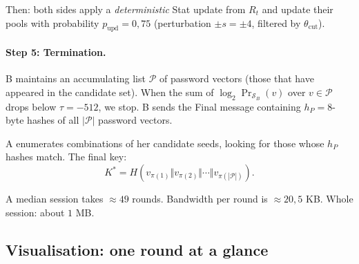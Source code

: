 \documentclass[11pt,a4paper]{article}
\begin{document}
Then: both sides apply a \emph{deterministic} Stat update from $R_t$ and update their pools with probability $p_\text{upd} = 0{,}75$ (perturbation $\pm s = \pm 4$, filtered by $\theta_\text{cut}$).

\paragraph{Step 5: Termination.}
B maintains an accumulating list $\mathcal{P}$ of password vectors (those that have appeared in the candidate set). When the sum of $\log_2 \Pr_{\mathcal{S}_B}(v)$ over $v \in \mathcal{P}$ drops below $\tau = -512$, we stop. B sends the Final message containing $h_P = 8$-byte hashes of all $|\mathcal{P}|$ password vectors.

A enumerates combinations of her candidate seeds, looking for those whose $h_P$ hashes match. The final key:
\[
K^* = H(v_{\pi(1)} \Vert v_{\pi(2)} \Vert \cdots \Vert v_{\pi(|\mathcal{P}|)}).
\]

A median session takes $\approx 49$ rounds. Bandwidth per round is $\approx 20{,}5$ KB. Whole session: about $1$ MB.

\subsection{Visualisation: one round at a glance}
\end{document}
